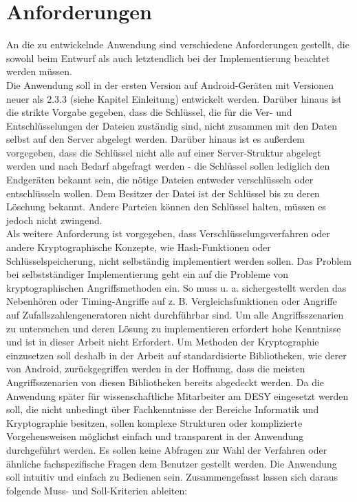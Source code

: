 \documentclass[10pt, a4paper]{scrreprt}
\begin{document}
\section{Anforderungen}
An die zu entwickelnde Anwendung sind verschiedene Anforderungen gestellt, die sowohl beim Entwurf als auch letztendlich bei der Implementierung beachtet werden müssen. \\
Die Anwendung soll in der ersten Version auf Android-Geräten mit Versionen neuer als 2.3.3 (siehe Kapitel Einleitung) entwickelt werden. Darüber hinaus ist die strikte Vorgabe gegeben, dass die Schlüssel, die für die Ver- und Entschlüsselungen der Dateien zuständig sind, nicht zusammen mit den Daten selbst auf den Server abgelegt werden. Darüber hinaus ist es außerdem vorgegeben, dass die Schlüssel nicht alle auf einer Server-Struktur abgelegt werden und nach Bedarf abgefragt werden - die Schlüssel sollen lediglich den Endgeräten bekannt sein, die nötige Dateien entweder verschlüsseln oder entschlüsseln wollen. Dem Besitzer der Datei ist der Schlüssel bis zu deren Löschung bekannt. Andere Parteien können den Schlüssel halten, müssen es jedoch nicht zwingend. \\
Als weitere Anforderung ist vorgegeben, dass Verschlüsselungsverfahren oder andere Kryptographische Konzepte, wie Hash-Funktionen oder Schlüsselspeicherung, nicht selbständig implementiert werden sollen. Das Problem bei selbstständiger Implementierung geht ein auf die Probleme von kryptographischen Angriffsmethoden ein. So muss u. a. sichergestellt werden das Nebenhören oder Timing-Angriffe auf z. B. Vergleichsfunktionen oder Angriffe auf Zufallszahlengeneratoren nicht durchführbar sind. Um alle Angriffsszenarien zu untersuchen und deren Lösung zu implementieren erfordert hohe Kenntnisse und ist in dieser Arbeit nicht Erfordert. Um Methoden der Kryptographie einzusetzen soll deshalb in der Arbeit auf standardisierte Bibliotheken, wie derer von Android, zurückgegriffen werden in der Hoffnung, dass die meisten Angriffsszenarien von diesen Bibliotheken bereits abgedeckt werden. Da die Anwendung später für wissenschaftliche Mitarbeiter am DESY eingesetzt werden soll, die nicht unbedingt über Fachkenntnisse der Bereiche Informatik und Kryptographie besitzen, sollen komplexe Strukturen oder komplizierte Vorgehensweisen möglichst einfach und transparent in der Anwendung durchgeführt werden. Es sollen keine Abfragen zur Wahl der Verfahren oder ähnliche fachspezifische Fragen dem Benutzer gestellt werden. Die Anwendung soll intuitiv und einfach zu Bedienen sein. Zusammengefasst lassen sich daraus folgende Muss- und Soll-Kriterien ableiten: \\ \\
\end{document}
